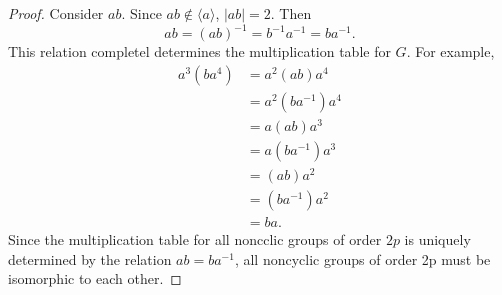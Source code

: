 \documentclass{article}
\theoremstyle{definition}
\begin{document}
\begin{proof}
        Consider $ab$. Since $ab \notin \langle a \rangle$, $|ab| = 2$. Then
        \begin{equation*}
            ab = (ab)^{-1} = b^{-1}a^{-1} = ba^{-1}.
        \end{equation*}
        This relation completel determines the multiplication table for $G$. For example,
        \begin{align*}
            a^3(ba^4) &= a^2(ab)a^4 \\ 
            &= a^2(ba^{-1})a^4 \\
            &= a(ab)a^3 \\
            &= a(ba^{-1})a^3 \\
            &= (ab)a^2 \\
            &= (ba^{-1})a^2 \\ 
            &= ba.
        \end{align*}
        Since the multiplication table for all noncclic groups of order $2p$ is uniquely determined by the relation $ab=ba^{-1}$, all noncyclic groups of order 2p must be isomorphic to each other. 
     \end{proof}
     
\end{document}
